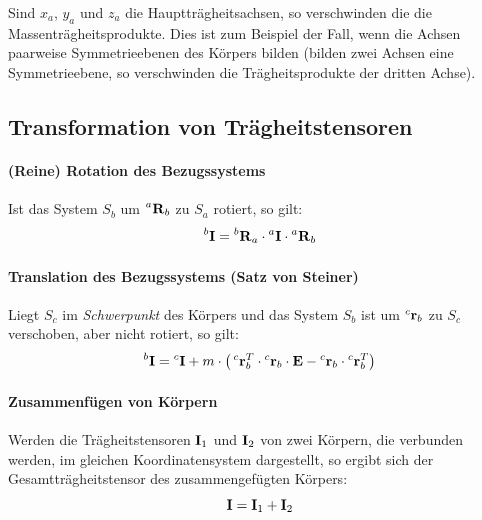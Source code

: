 		Sind \(x_a\), \(y_a\) und \(z_a\) die Hauptträgheitsachsen, so verschwinden die die Massenträgheitsprodukte. Dies ist zum Beispiel der Fall, wenn die Achsen paarweise Symmetrieebenen des Körpers bilden (bilden zwei Achsen eine Symmetrieebene, so verschwinden die Trägheitsprodukte der dritten Achse).
		
		\subsection{Transformation von Trägheitstensoren}
			\paragraph{(Reine) Rotation des Bezugssystems}
			Ist das System \(S_b\) um \(\prescript{a}{}{\boldsymbol{\mathrm{R}}}_b\) zu \(S_a\) rotiert, so gilt:
			\begin{equation*}
				\prescript{b}{}{\boldsymbol{\mathrm{I}}} = \prescript{b}{}{\boldsymbol{\mathrm{R}}}_a \cdot \prescript{a}{}{\boldsymbol{\mathrm{I}}} \cdot \prescript{a}{}{\boldsymbol{\mathrm{R}}}_b
			\end{equation*}
			
			\paragraph{Translation des Bezugssystems (Satz von Steiner)}
			Liegt \(S_c\) im \emph{Schwerpunkt} des Körpers und das System \(S_b\) ist um \(\prescript{c}{}{\boldsymbol{\mathrm{r}}_b}\) zu \(S_c\) verschoben, aber nicht rotiert, so gilt:
			\begin{equation*}
				\prescript{b}{}{\boldsymbol{\mathrm{I}}} = \prescript{c}{}{\boldsymbol{\mathrm{I}}} + m \cdot \big( \prescript{c}{}{\boldsymbol{\mathrm{r}}}_b^T \cdot \prescript{c}{}{\boldsymbol{\mathrm{r}}}_b \cdot \boldsymbol{\mathrm{E}} - \prescript{c}{}{\boldsymbol{\mathrm{r}}}_b \cdot \prescript{c}{}{\boldsymbol{\mathrm{r}}}_b^T \big)
			\end{equation*}
			
			\paragraph{Zusammenfügen von Körpern}
			Werden die Trägheitstensoren \( \boldsymbol{\mathrm{I}}_1 \) und \( \boldsymbol{\mathrm{I}}_2 \) von zwei Körpern, die verbunden werden, im gleichen Koordinatensystem dargestellt, so ergibt sich der Gesamtträgheitstensor des zusammengefügten Körpers:
			\begin{equation*}
				\boldsymbol{\mathrm{I}} = \boldsymbol{\mathrm{I}}_1 + \boldsymbol{\mathrm{I}}_2
			\end{equation*}

